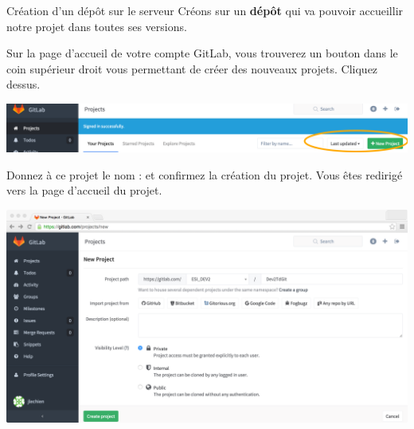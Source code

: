 \documentclass[a4paper,11pt]{style-esi/td}
\begin{document}
\begin{Tutoriel}{Création d'un dépôt sur le serveur}
	Créons sur  un \textbf{dépôt} 
	qui va pouvoir accueillir notre projet dans toutes ses versions.
	\begin{steps}
	\item 
		Sur la page d'accueil de votre compte GitLab, 
		vous trouverez un bouton dans le coin supérieur droit 
		vous permettant de créer des nouveaux projets.
		Cliquez dessus.
		\begin{center}
			\includegraphics[width=.5\textwidth]{image/GitLabCreateProject00.png}
		\end{center}
	\item 
		Donnez à ce projet le nom : 
		et confirmez la création du projet.
		Vous êtes redirigé vers la page d'accueil du projet.
		\begin{center}
			\includegraphics[width=.5\textwidth]{image/GitLabCreateProject01.png}
		\end{center}
	\end{steps}
\end{Tutoriel}
\end{document}

